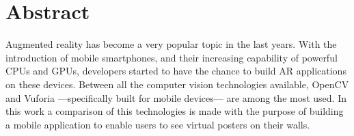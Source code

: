 \chapter{Abstract}
Augmented reality has become a very popular topic in the last years. With
the introduction of mobile smartphones, and their increasing capability of
powerful CPUs and GPUs, developers started to have the chance
to build AR applications on these devices. Between all the computer vision
technologies available, OpenCV and Vuforia ---specifically built for mobile
devices--- are among the most used. In this work a comparison of this technologies
is made with the purpose of building a mobile application to enable users to see
virtual posters on their walls.

